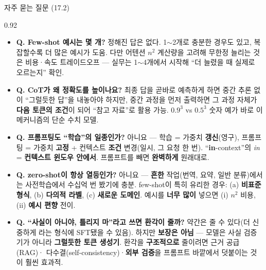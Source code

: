 \begin{frame}[shrink=29]{자주 묻는 질문 (17.2)}
\begin{center}\begin{varwidth}{0.92\textwidth}
  \begin{itemize}
    \item \textbf{Q. Few-shot 예시는 몇 개?} 정해진 답은
      없다. 1$\sim$2개로 충분한 경우도 있고, 복잡할수록
      더 많은 예시가 도움. 다만 어텐션 $n^2$ 계산량을
      고려해 무한정 늘리는 것은 비용·속도 트레이드오프 —
      실무는 1$\sim$4개에서 시작해 ``더 늘렸을 때 실제로
      오르는지'' 확인.
    \item \textbf{Q. CoT가 왜 정확도를 높이나요?} 최종
      답을 곧바로 예측하게 하면 중간 추론 없이 ``그럴듯한
      답''을 내놓아야 하지만, 중간 과정을 먼저 출력하면 그
      과정 자체가 \textbf{다음 토큰의 조건}이 되어
      ``참고 자료''로 활용 가능. $0.9^3$ vs $0.5^3$ 숫자
      예가 바로 이 메커니즘의 단순 수치 모델.
    \item \textbf{Q. 프롬프팅도 ``학습''의 일종인가?}
      아니요 --- 학습 = 가중치 \textbf{갱신}(영구),
      프롬프팅 = 가중치 \textbf{고정} + 컨텍스트
      \textbf{조건} 변경(일시, 그 요청 한 번).
      ``\textbf{in}-context''의 \textit{in} =
      \textbf{컨텍스트 윈도우 안에서}. 프롬프트를 빼면
      \textbf{완벽하게} 원래대로.
    \item \textbf{Q. zero-shot이 항상 열등인가?} 아니요 ---
      \textbf{흔한} 작업(번역, 요약, 일반 분류)에서는
      사전학습에서 수십억 번 봤기에 충분. few-shot이 특히
      유리한 경우: (a) \textbf{비표준 형식}, (b)
      \textbf{다의적 라벨}, (c) \textbf{새로운 도메인}.
      예시를 \textbf{너무 많이} 넣으면 (i) $n^2$ 비용,
      (ii) \textbf{예시 편향} 전이. 
    \item \textbf{Q. ``사실이 아니야, 틀리지 마''라고 쓰면
      환각이 줄까?} 약간은 줄 수 있다(더 신중하게 라는
      형식에 SFT됐을 수 있음). 하지만 \textbf{보장은
      아님} --- 모델은 사실 검증기가 아니라
      \textbf{그럴듯한 토큰 생성기}. 환각을
      \textbf{구조적으로} 줄이려면 근거 공급(RAG)·
      다수결(self-consistency)·\textbf{외부 검증}을
      프롬프트 바깥에서 덧붙이는 것이 훨씬 효과적.
  \end{itemize}
\end{varwidth}\end{center}
\end{frame}
